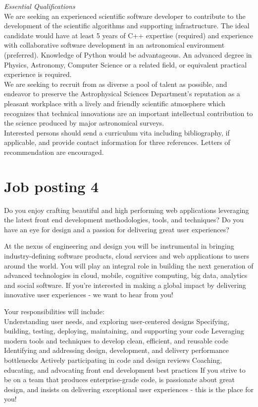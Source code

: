 \textit{Essential Qualifications}\\
We are seeking an experienced scientific software developer to contribute to the development of the scientific algorithms and supporting infrastructure. The ideal candidate would have at least 5 years of C++ expertise (required) and experience with collaborative software development in an astronomical environment (preferred). Knowledge of Python would be advantageous. An advanced degree in Physics, Astronomy, Computer Science or a related field, or equivalent practical experience is required.\\

We are seeking to recruit from as diverse a pool of talent as possible, and endeavor to preserve the Astrophysical Sciences Department's reputation as a pleasant workplace with a lively and friendly scientific atmosphere which recognizes that technical innovations are an important intellectual contribution to the science produced by major astronomical surveys.\\

Interested persons should send a curriculum vita including bibliography, if applicable, and provide contact information for three references. Letters of recommendation are encouraged.

\section{Job posting 4}\label{sec:job-posting-four}
Do you enjoy crafting beautiful and high performing web applications leveraging the latest front end development methodologies, tools, and techniques? Do you have an eye for design and a passion for delivering great user experiences?

At the nexus of engineering and design you will be instrumental in bringing industry-defining software products, cloud services and web applications to users around the world. You will play an integral role in building the next generation of advanced technologies in cloud, mobile, cognitive computing, big data, analytics and social software. If you're interested in making a global impact by delivering innovative user experiences - we want to hear from you!

Your responsibilities will include:\\

Understanding user needs, and exploring user-centered designs
Specifying, building, testing, deploying, maintaining, and supporting your code
Leveraging modern tools and techniques to develop clean, efficient, and reusable code
Identifying and addressing design, development, and delivery performance bottlenecks
Actively participating in code and design reviews
Coaching, educating, and advocating front end development best practices
If you strive to be on a team that produces enterprise-grade code, is passionate about great design, and insists on delivering exceptional user experiences - this is the place for you!

